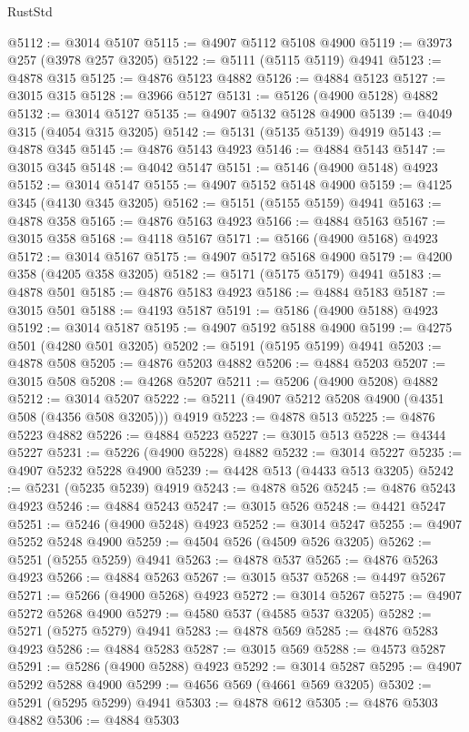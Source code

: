 \begin{lexlean}{RustStd}
\begin{coremodule}
@5112 := @3014 @5107
@5115 := @4907 @5112 @5108 @4900
@5119 := @3973 @257 (@3978 @257 @3205)
@5122 := @5111 (@5115 @5119) @4941
@5123 := @4878 @315
@5125 := @4876 @5123 @4882
@5126 := @4884 @5123
@5127 := @3015 @315
@5128 := @3966 @5127
@5131 := @5126 (@4900 @5128) @4882
@5132 := @3014 @5127
@5135 := @4907 @5132 @5128 @4900
@5139 := @4049 @315 (@4054 @315 @3205)
@5142 := @5131 (@5135 @5139) @4919
@5143 := @4878 @345
@5145 := @4876 @5143 @4923
@5146 := @4884 @5143
@5147 := @3015 @345
@5148 := @4042 @5147
@5151 := @5146 (@4900 @5148) @4923
@5152 := @3014 @5147
@5155 := @4907 @5152 @5148 @4900
@5159 := @4125 @345 (@4130 @345 @3205)
@5162 := @5151 (@5155 @5159) @4941
@5163 := @4878 @358
@5165 := @4876 @5163 @4923
@5166 := @4884 @5163
@5167 := @3015 @358
@5168 := @4118 @5167
@5171 := @5166 (@4900 @5168) @4923
@5172 := @3014 @5167
@5175 := @4907 @5172 @5168 @4900
@5179 := @4200 @358 (@4205 @358 @3205)
@5182 := @5171 (@5175 @5179) @4941
@5183 := @4878 @501
@5185 := @4876 @5183 @4923
@5186 := @4884 @5183
@5187 := @3015 @501
@5188 := @4193 @5187
@5191 := @5186 (@4900 @5188) @4923
@5192 := @3014 @5187
@5195 := @4907 @5192 @5188 @4900
@5199 := @4275 @501 (@4280 @501 @3205)
@5202 := @5191 (@5195 @5199) @4941
@5203 := @4878 @508
@5205 := @4876 @5203 @4882
@5206 := @4884 @5203
@5207 := @3015 @508
@5208 := @4268 @5207
@5211 := @5206 (@4900 @5208) @4882
@5212 := @3014 @5207
@5222 := @5211 (@4907 @5212 @5208 @4900 (@4351 @508 (@4356 @508 @3205))) @4919
@5223 := @4878 @513
@5225 := @4876 @5223 @4882
@5226 := @4884 @5223
@5227 := @3015 @513
@5228 := @4344 @5227
@5231 := @5226 (@4900 @5228) @4882
@5232 := @3014 @5227
@5235 := @4907 @5232 @5228 @4900
@5239 := @4428 @513 (@4433 @513 @3205)
@5242 := @5231 (@5235 @5239) @4919
@5243 := @4878 @526
@5245 := @4876 @5243 @4923
@5246 := @4884 @5243
@5247 := @3015 @526
@5248 := @4421 @5247
@5251 := @5246 (@4900 @5248) @4923
@5252 := @3014 @5247
@5255 := @4907 @5252 @5248 @4900
@5259 := @4504 @526 (@4509 @526 @3205)
@5262 := @5251 (@5255 @5259) @4941
@5263 := @4878 @537
@5265 := @4876 @5263 @4923
@5266 := @4884 @5263
@5267 := @3015 @537
@5268 := @4497 @5267
@5271 := @5266 (@4900 @5268) @4923
@5272 := @3014 @5267
@5275 := @4907 @5272 @5268 @4900
@5279 := @4580 @537 (@4585 @537 @3205)
@5282 := @5271 (@5275 @5279) @4941
@5283 := @4878 @569
@5285 := @4876 @5283 @4923
@5286 := @4884 @5283
@5287 := @3015 @569
@5288 := @4573 @5287
@5291 := @5286 (@4900 @5288) @4923
@5292 := @3014 @5287
@5295 := @4907 @5292 @5288 @4900
@5299 := @4656 @569 (@4661 @569 @3205)
@5302 := @5291 (@5295 @5299) @4941
@5303 := @4878 @612
@5305 := @4876 @5303 @4882
@5306 := @4884 @5303

\end{coremodule}
\end{lexlean}

